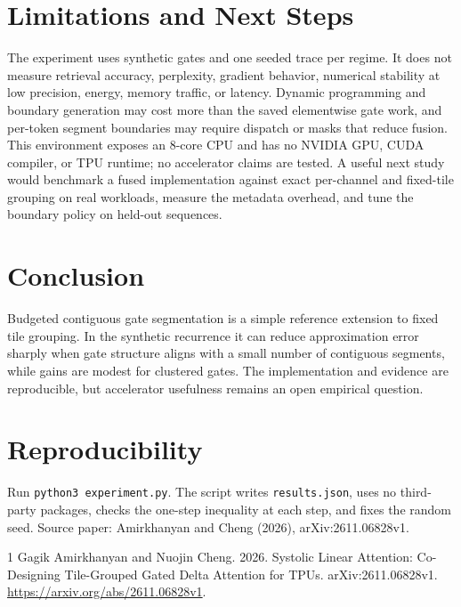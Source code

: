 \documentclass[11pt]{article}
\begin{document}
\section{Limitations and Next Steps}
The experiment uses synthetic gates and one seeded trace per regime. It does not measure retrieval accuracy, perplexity, gradient behavior, numerical stability at low precision, energy, memory traffic, or latency. Dynamic programming and boundary generation may cost more than the saved elementwise gate work, and per-token segment boundaries may require dispatch or masks that reduce fusion. This environment exposes an 8-core CPU and has no NVIDIA GPU, CUDA compiler, or TPU runtime; no accelerator claims are tested. A useful next study would benchmark a fused implementation against exact per-channel and fixed-tile grouping on real workloads, measure the metadata overhead, and tune the boundary policy on held-out sequences.
\section{Conclusion}
Budgeted contiguous gate segmentation is a simple reference extension to fixed tile grouping. In the synthetic recurrence it can reduce approximation error sharply when gate structure aligns with a small number of contiguous segments, while gains are modest for clustered gates. The implementation and evidence are reproducible, but accelerator usefulness remains an open empirical question.
\section*{Reproducibility}
Run \texttt{python3 experiment.py}. The script writes \texttt{results.json}, uses no third-party packages, checks the one-step inequality at each step, and fixes the random seed. Source paper: Amirkhanyan and Cheng (2026), arXiv:2611.06828v1.
\begin{thebibliography}{1}
Gagik Amirkhanyan and Nuojin Cheng. 2026. Systolic Linear Attention: Co-Designing Tile-Grouped Gated Delta Attention for TPUs. arXiv:2611.06828v1. \url{https://arxiv.org/abs/2611.06828v1}.
\end{thebibliography}
\end{document}
